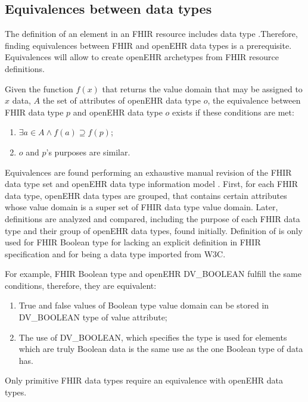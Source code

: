 \subsection{Equivalences between data types}

The definition of an element in an FHIR resource includes data type \cite{FHIRElementDefinition}.Therefore, finding equivalences between FHIR and openEHR data types is a prerequisite. Equivalences will allow to create openEHR archetypes from FHIR resource definitions.

Given the function \( f(x) \) that returns the value domain that may be assigned to \( x \) data, \( A \) the set of attributes of openEHR data type \( o \), the equivalence between FHIR data type \( p \) and openEHR data type \( o \) exists if these conditions are met:

\begin{enumerate}
  \item \( \exists a \in A \land f(a) \supseteq f(p) \);
  \item \( o \) and \( p \)'s purposes are similar.
\end{enumerate}

Equivalences are found performing an exhaustive manual revision of the FHIR data type set \cite{FHIRDataTypes} and openEHR data type information model \cite{openEHRDataTypes}. First, for each FHIR data type, openEHR data types are grouped, that contains certain attributes whose value domain is a super set of FHIR data type value domain. Later, definitions are analyzed and compared, including the purpose of each FHIR data type and their group of openEHR data types, found initially. Definition of \cite{W3C} is only used for FHIR Boolean type for lacking an explicit definition in FHIR specification and for being a data type imported from W3C.

For example, FHIR Boolean type and openEHR DV\_\-BOOLEAN fulfill the same conditions, therefore, they are equivalent:
\begin{enumerate}
  \item True and false values of Boolean type value domain can be stored in DV\_BOOLEAN type of value attribute;
  \item The use of DV\_BOOLEAN, which specifies the type is used for elements which are truly Boolean data is the same use as the one Boolean type of data has.
\end{enumerate}

Only primitive FHIR data types require an equivalence with openEHR data types.

